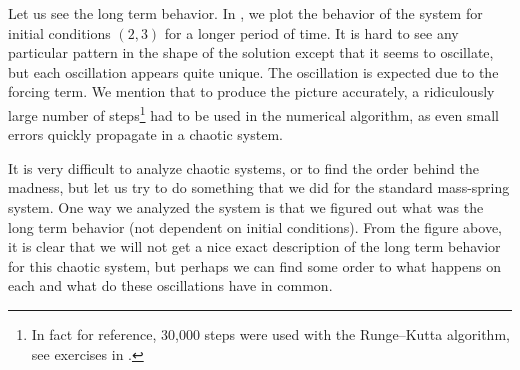 \begin{myfig}
\capstart
\caption{On left, two trajectories in phase space for $0 \leq t \leq 15$, for the Duffing equation
one with initial conditions $(2,3)$ and the other with $(2,2.9)$.  On
right the two solutions in $(x,t)$-space. \label{nlin:duf-two-traj}}
\end{myfig}

\begin{myfig}
\capstart
{}
\caption{The solution to the given Duffing equation for $t$ from 0 to 100.
\label{nlin:duf-long}}
\end{myfig}

\pagebreak[2]
Let us see the long term behavior.
In ,
we plot the behavior of the system for initial conditions $(2,3)$ for
a longer period of time.
It is hard to see any particular pattern
in the shape of the solution except that it seems to oscillate, but each
oscillation appears quite unique.  The oscillation
is expected due to the forcing term.
We mention that to produce the picture accurately,
a ridiculously large number of steps\footnote{In
fact for reference, 30,000 steps were used with the Runge--Kutta
algorithm, see exercises in .}
had to be used in the numerical
algorithm,
as even small errors quickly propagate in a chaotic system.


It is very difficult to analyze chaotic systems, or to find the
order behind the madness, but let us try to do something that we did for
the standard mass-spring system.  One way we analyzed
the system is that we figured out what was the long term behavior (not
dependent on initial conditions).  From the figure above, it is clear
that we will not get a nice exact description of the long term behavior
for this chaotic system, but
perhaps we can find some order to what happens on each
and what do these oscillations have in common.

